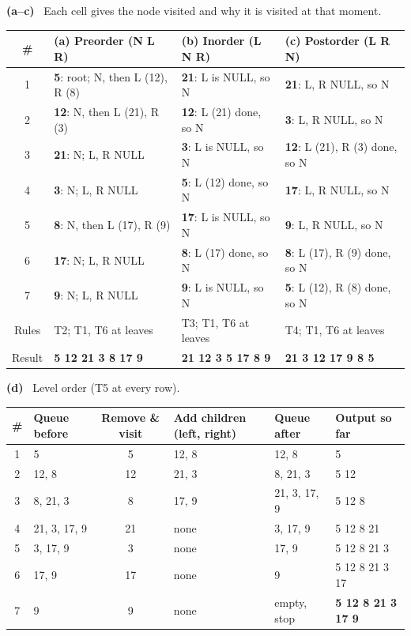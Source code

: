 \documentclass[11pt]{article}
\newcommand{\pa}[2][0mm]{\par\smallskip\needspace{#1}\textbf{(#2)}\ }
\begin{document}
\pa{a--c} Each cell gives the node visited and why it is visited at that moment.
\begin{center}\small
\begin{tabularx}{\textwidth}{@{}cYYY@{}}
\toprule
\# & (a) Preorder (N L R) & (b) Inorder (L N R) & (c) Postorder (L R N)\\
 & \textbf{5}: root; N, then L (12), R (8) & \textbf{21}: L is NULL, so N & \textbf{21}: L, R NULL, so N\\
2 & \textbf{12}: N, then L (21), R (3)       & \textbf{12}: L (21) done, so N & \textbf{3}: L, R NULL, so N\\
3 & \textbf{21}: N; L, R NULL                & \textbf{3}: L is NULL, so N & \textbf{12}: L (21), R (3) done, so N\\
4 & \textbf{3}: N; L, R NULL                 & \textbf{5}: L (12) done, so N & \textbf{17}: L, R NULL, so N\\
5 & \textbf{8}: N, then L (17), R (9)        & \textbf{17}: L is NULL, so N & \textbf{9}: L, R NULL, so N\\
6 & \textbf{17}: N; L, R NULL                & \textbf{8}: L (17) done, so N & \textbf{8}: L (17), R (9) done, so N\\
7 & \textbf{9}: N; L, R NULL                 & \textbf{9}: L is NULL, so N & \textbf{5}: L (12), R (8) done, so N\\
\midrule
Rules & T2; T1, T6 at leaves & T3; T1, T6 at leaves & T4; T1, T6 at leaves\\
Result & \textbf{5 12 21 3 8 17 9} & \textbf{21 12 3 5 17 8 9} & \textbf{21 3 12 17 9 8 5}\\
\bottomrule
\end{tabularx}
\end{center}

\pa[45mm]{d} Level order (T5 at every row).
\begin{center}\small
\begin{tabular}{@{}clclll@{}}
\toprule
\# & Queue before & Remove \& visit & Add children (left, right) & Queue after & Output so far\\
\midrule
1 & 5            & 5  & 12, 8 & 12, 8        & 5\\
2 & 12, 8        & 12 & 21, 3 & 8, 21, 3     & 5 12\\
3 & 8, 21, 3     & 8  & 17, 9 & 21, 3, 17, 9 & 5 12 8\\
4 & 21, 3, 17, 9 & 21 & none  & 3, 17, 9     & 5 12 8 21\\
5 & 3, 17, 9     & 3  & none  & 17, 9        & 5 12 8 21 3\\
6 & 17, 9        & 17 & none  & 9            & 5 12 8 21 3 17\\
7 & 9            & 9  & none  & empty, stop  & \textbf{5 12 8 21 3 17 9}\\
\bottomrule
\end{tabular}
\end{center}
\end{document}
